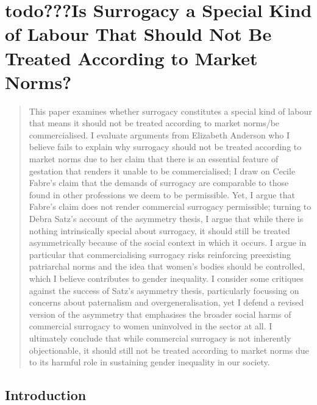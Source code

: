 \chapter{todo???Is Surrogacy a Special Kind of Labour That Should Not Be Treated According to Market Norms?}

\renewcommand*{\thesection}{\arabic{section}.}
\renewcommand*{\thesubsection}{\arabic{section}.\arabic{subsection}:}

\begin{quote}
    This paper examines whether
surrogacy constitutes a special kind of labour that means it should not
be treated according to market norms/be commercialised. I evaluate
arguments from Elizabeth Anderson who I believe fails to explain why
surrogacy should not be treated according to market norms due to her
claim that there is an essential feature of gestation that renders it
unable to be commercialised; I draw on Cecile Fabre's claim that the
demands of surrogacy are comparable to those found in other professions
we deem to be permissible. Yet, I argue that Fabre's claim does not
render commercial surrogacy permissible; turning to Debra Satz's account
of the asymmetry thesis, I argue that while there is nothing
intrinsically special about surrogacy, it should still be treated
asymmetrically because of the social context in which it occurs. I argue
in particular that commercialising surrogacy risks reinforcing
preexisting patriarchal norms and the idea that women's bodies should be
controlled, which I believe contributes to gender inequality. I consider
some critiques against the success of Satz's asymmetry thesis,
particularly focussing on concerns about paternalism and
overgeneralisation, yet I defend a revised version of the asymmetry that
emphasises the broader social harms of commercial surrogacy to women
uninvolved in the sector at all. I ultimately conclude that while
commercial surrogacy is not inherently objectionable, it should still
not be treated according to market norms due to its harmful role in
sustaining gender inequality in our society. 
\end{quote}

\section*{Introduction}

